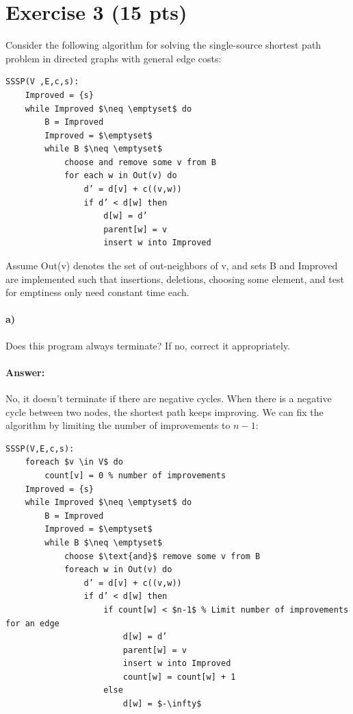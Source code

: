 \documentclass[a4paper]{article}
\begin{document}
\section*{Exercise 3 (15 pts)}

Consider the following algorithm for solving the single-source shortest path problem in directed graphs with general edge costs:

\begin{lstlisting}[mathescape]
SSSP(V ,E,c,s):
    Improved = {s}
    while Improved $\neq \emptyset$ do
        B = Improved
        Improved = $\emptyset$
        while B $\neq \emptyset$
            choose and remove some v from B
            for each w in Out(v) do
                d’ = d[v] + c((v,w))
                if d’ < d[w] then
                    d[w] = d’
                    parent[w] = v
                    insert w into Improved
\end{lstlisting}

Assume Out(v) denotes the set of out-neighbors of v, and sets B and Improved are implemented such that insertions, deletions, choosing some element, and test for emptiness only need constant time each.

\paragraph{a)} Does this program always terminate? If no, correct it appropriately.

\paragraph{Answer:}

No, it doesn't terminate if there are negative cycles. When there is a negative cycle between two nodes, the shortest path keeps improving. We can fix the algorithm by limiting the number of improvements to $n-1$:

\begin{lstlisting}[mathescape, commentstyle=\color{red}, keywordstyle=\color{blue}]
SSSP(V,E,c,s):
    foreach $v \in V$ do
        count[v] = 0 % number of improvements
    Improved = {s}
    while Improved $\neq \emptyset$ do
        B = Improved
        Improved = $\emptyset$
        while B $\neq \emptyset$
            choose $\text{and}$ remove some v from B
            foreach w in Out(v) do
                d’ = d[v] + c((v,w))
                if d’ < d[w] then
                    if count[w] < $n-1$ % Limit number of improvements for an edge
                        d[w] = d’
                        parent[w] = v
                        insert w into Improved
                        count[w] = count[w] + 1
                    else
                        d[w] = $-\infty$
\end{lstlisting}
\end{document}
